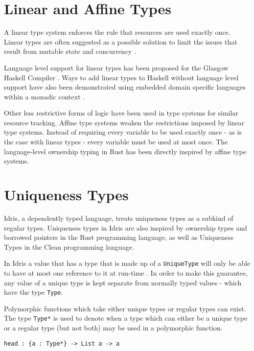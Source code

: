 \documentclass[onehalf,11pt]{beavtex}
\begin{document}
\section{Linear and Affine Types}

A linear type system enforces the rule that resources are used exactly once.
Linear types are often suggested as a possible solution to limit the issues that
result from mutable state \cite{Wadler90lineartypes} and concurrency
\cite{caires2010session}.

Language level support for linear types has been proposed for the Glasgow
Haskell Compiler \cite{LinearTypesGHC}.
Ways to add linear types to Haskell without language level support have also
been demonstrated using embedded domain specific languages within a monadic
context \cite{Paykin:2017:LM:3122955.3122965}. 

Other less restrictive forms of logic have been used in type systems for similar
resource tracking.
Affine type systems weaken the restrictions imposed by linear type systems.
Instead of requiring every variable to be used exactly once - as is the case
with linear types - every variable must be used at most once.
The language-level ownership typing in Rust has been directly inspired by affine
type systems.


\section{Uniqueness Types}

Idris, a dependently typed language, treats uniqueness types as a subkind of
regular types. Uniqueness types in Idris are also inspired by ownership types
and borrowed pointers in the Rust programming language, as well as Uniqueness
Types in the Clean programming language.

In Idris a value that has a type that is made up of a \texttt{UniqueType}
will only be able to have at most one reference to it at run-time
\cite{idris_uniqueness_types}.
In order to make this guarantee, any value of a unique type is kept separate
from normally typed values - which have the type \texttt{Type}.

Polymorphic functions which take either unique types or regular
types can exist.
The type \texttt{Type*} is used to denote when a type which can either be a
unique type or a regular type (but not both) may be used in a polymorphic
function.

\begin{verbatim}
head : {a : Type*} -> List a -> a
\end{verbatim}
\end{document}
